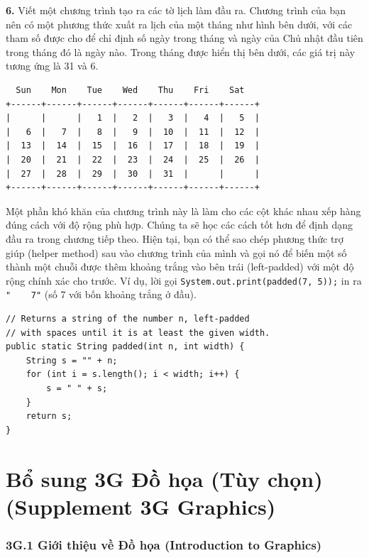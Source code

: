 \textbf{6.} Viết một chương trình tạo ra các tờ lịch làm đầu ra. Chương
trình của bạn nên có một phương thức xuất ra lịch của một tháng như hình
bên dưới, với các tham số được cho để chỉ định số ngày trong tháng và
ngày của Chủ nhật đầu tiên trong tháng đó là ngày nào. Trong tháng được
hiển thị bên dưới, các giá trị này tương ứng là 31 và 6.

\begin{verbatim}
  Sun    Mon    Tue    Wed    Thu    Fri    Sat
+------+------+------+------+------+------+------+
|      |      |   1  |   2  |   3  |   4  |   5  |
|   6  |   7  |   8  |   9  |  10  |  11  |  12  |
|  13  |  14  |  15  |  16  |  17  |  18  |  19  |
|  20  |  21  |  22  |  23  |  24  |  25  |  26  |
|  27  |  28  |  29  |  30  |  31  |      |      |
+------+------+------+------+------+------+------+
\end{verbatim}

Một phần khó khăn của chương trình này là làm cho các cột khác nhau xếp
hàng đúng cách với độ rộng phù hợp. Chúng ta sẽ học các cách tốt hơn để
định dạng đầu ra trong chương tiếp theo. Hiện tại, bạn có thể sao chép
phương thức trợ giúp (helper method) sau vào chương trình của mình và
gọi nó để biến một số thành một chuỗi được thêm khoảng trắng vào bên
trái (left-padded) với một độ rộng chính xác cho trước. Ví dụ, lời gọi
\texttt{System.out.print(padded(7,\ 5));} in ra \texttt{"\ \ \ \ 7"} (số
7 với bốn khoảng trắng ở đầu).

\begin{verbatim}
// Returns a string of the number n, left-padded
// with spaces until it is at least the given width.
public static String padded(int n, int width) {
    String s = "" + n;
    for (int i = s.length(); i < width; i++) {
        s = " " + s;
    }
    return s;
}
\end{verbatim}

\section{Bổ sung 3G Đồ họa (Tùy chọn) (Supplement 3G
Graphics)}\label{bux1ed5-sung-3g-ux111ux1ed3-hux1ecda-tuxf9y-chux1ecdn-supplement-3g-graphics}

\subsubsection{3G.1 Giới thiệu về Đồ họa (Introduction to
Graphics)}\label{g.1-giux1edbi-thiux1ec7u-vux1ec1-ux111ux1ed3-hux1ecda-introduction-to-graphics}

